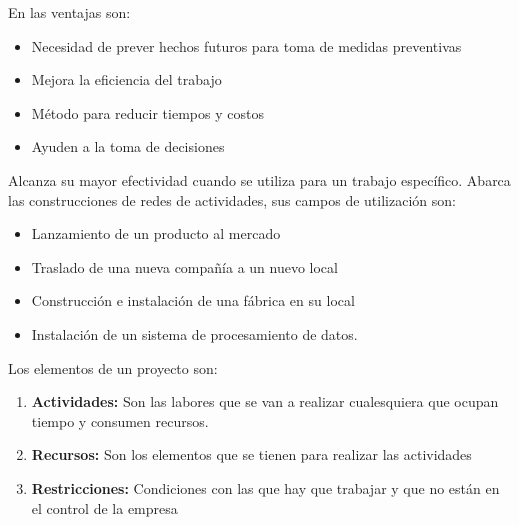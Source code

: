 En las ventajas son:
\begin{itemize}
    \item Necesidad de prever hechos futuros para toma de medidas preventivas
    \item Mejora la eficiencia del trabajo
    \item Método para reducir tiempos y costos
    \item Ayuden a la toma de decisiones
\end{itemize}
Alcanza su mayor efectividad cuando se utiliza para un trabajo específico. Abarca las construcciones de redes de actividades, sus campos de utilización son:
\begin{itemize}
    \item Lanzamiento de un producto al mercado
    \item Traslado de una nueva compañía a un nuevo local
    \item Construcción e instalación de una fábrica en su local
    \item Instalación de un sistema de procesamiento de datos.
\end{itemize}
Los elementos de un proyecto son:
\begin{enumerate}
    \item \textbf{Actividades:} Son las labores que se van a realizar cualesquiera que ocupan tiempo y consumen recursos.
    \item \textbf{Recursos:} Son los elementos que se tienen para realizar las actividades
    \item \textbf{Restricciones:} Condiciones con las que hay que trabajar y que no están en el control de la empresa
\end{enumerate}
